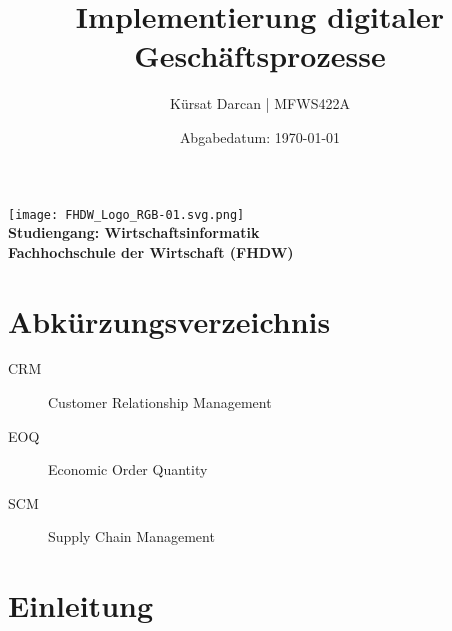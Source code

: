 \documentclass[a4paper,12pt]{article}
\title{\textbf{Implementierung digitaler Geschäftsprozesse}}
\author{Kürsat Darcan | MFWS422A}
\date{Abgabedatum: \today}
\begin{document}
\maketitle
\thispagestyle{empty}
\vspace{2cm}
\begin{center}
    \texttt{[image: FHDW\_Logo\_RGB-01.svg.png]} %
    \\
    \vspace{1cm}
    \textbf{Studiengang: Wirtschaftsinformatik}\\
    \textbf{Fachhochschule der Wirtschaft (FHDW)}
\end{center}
\newpage

\renewcommand{\thepage}{\roman{page}} %
\tableofcontents
\newpage

\listoffigures
{}
\newpage

\listoftables
{}
\newpage

\section*{Abkürzungsverzeichnis}
\begin{description}
    \item[CRM] Customer Relationship Management
    \item[EOQ] Economic Order Quantity
    \item[SCM] Supply Chain Management
\end{description}
\newpage

\renewcommand{\thepage}{\arabic{page}} %
\setcounter{page}{1}


\section{Einleitung}
\end{document}
